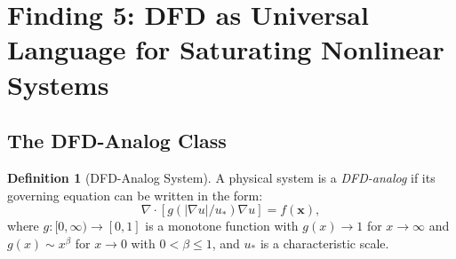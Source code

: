 \documentclass[11pt]{article}
\theoremstyle{definition}
\newtheorem{definition}[theorem]{Definition}
\theoremstyle{remark}
\begin{document}
\section{Finding 5: DFD as Universal Language for Saturating Nonlinear Systems}
\label{sec:universal-language}

\subsection{The DFD-Analog Class}
\label{sec:dfd-analog}

\begin{definition}[DFD-Analog System]
\label{def:dfd-analog}
A physical system is a \emph{DFD-analog} if its governing equation can
be written in the form:
\begin{equation}
  \nabla \cdot [g(|\nabla u|/u_*) \nabla u] = f(\mathbf{x}),
  \label{eq:dfd-analog}
\end{equation}
where $g: [0,\infty) \to [0,1]$ is a monotone function with $g(x) \to 1$
for $x \to \infty$ and $g(x) \sim x^\beta$ for $x \to 0$ with
$0 < \beta \leq 1$, and $u_*$ is a characteristic scale.
\end{definition}
\end{document}
